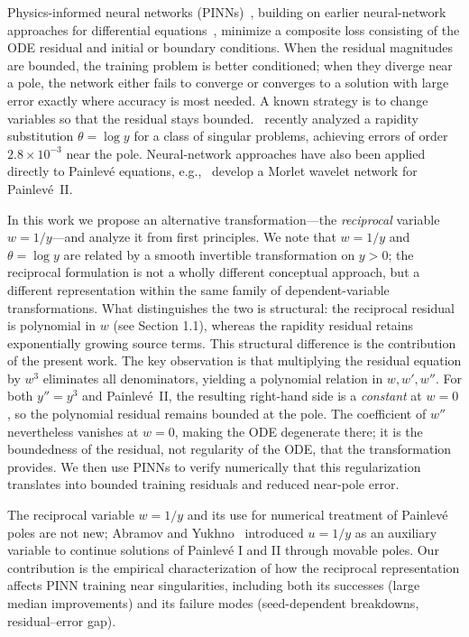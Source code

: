 \documentclass[a4paper, 10pt]{article}
\theoremstyle{definition}
\begin{document}
Physics-informed neural networks (PINNs)~\cite{Raissi2019,Karniadakis2021,Cuomo2022}, building on earlier neural-network approaches for differential equations~\cite{Lagaris1998,Sirignano2018}, minimize a composite loss consisting of the ODE residual and initial or boundary conditions. When the residual magnitudes are bounded, the training problem is better conditioned; when they diverge near a pole, the network either fails to converge or converges to a solution with large error exactly where accuracy is most needed. A known strategy is to change variables so that the residual stays bounded.~\citet{Cayuso2025} recently analyzed a rapidity substitution \(\theta = \log y\) for a class of singular problems, achieving errors of order \(2.8 \times 10^{-3}\) near the pole. Neural-network approaches have also been applied directly to Painlev\'e equations, e.g.,~\citet{Faisal2025} develop a Morlet wavelet network for Painlev\'e~II.

In this work we propose an alternative transformation---the \emph{reciprocal} variable \(w = 1/y\)---and analyze it from first principles. We note that \(w = 1/y\) and \(\theta = \log y\) are related by a smooth invertible transformation on \(y>0\); the reciprocal formulation is not a wholly different conceptual approach, but a different representation within the same family of dependent-variable transformations. What distinguishes the two is structural: the reciprocal residual is polynomial in \(w\) (see Section 1.1), whereas the rapidity residual retains exponentially growing source terms. This structural difference is the contribution of the present work. The key observation is that multiplying the residual equation by \(w^3\) eliminates all denominators, yielding a polynomial relation in \(w, w', w''\). For both \(y''=y^3\) and Painlev\'e~II, the resulting right-hand side is a \emph{constant} at \(w=0\), so the polynomial residual remains bounded at the pole. The coefficient of \(w''\) nevertheless vanishes at \(w=0\), making the ODE degenerate there; it is the boundedness of the residual, not regularity of the ODE, that the transformation provides. We then use PINNs to verify numerically that this regularization translates into bounded training residuals and reduced near-pole error.

The reciprocal variable \(w = 1/y\) and its use for numerical treatment of Painlev\'e poles are not new; Abramov and Yukhno~\cite{Abramov2012} introduced \(u=1/y\) as an auxiliary variable to continue solutions of Painlev\'e I and II through movable poles. Our contribution is the empirical characterization of how the reciprocal representation affects PINN training near singularities, including both its successes (large median improvements) and its failure modes (seed-dependent breakdowns, residual--error gap).
\end{document}
